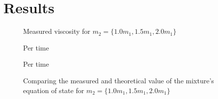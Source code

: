 \chapter{Results}

\begin{figure}[htbp]
    \begin{center}
        
        \caption{
            Measured viscosity for $m_2 = 
            \{1.0m_1, 1.5m_1, 2.0m_1\}$
        }
    \end{center}
\end{figure}

\begin{figure}[htbp]
    \begin{center}
        
        \caption{
            Per time
        }
    \end{center}
\end{figure}

\begin{figure}[htbp]
    \begin{center}
        
        \caption{
            Per time
        }
    \end{center}
\end{figure}

\begin{figure}[htbp]
    \begin{center}
        
    \end{center}
        \caption{
            Comparing the measured and theoretical value of the mixture's
            equation of state for $m_2 = \{1.0m_1, 1.5m_1, 2.0m_1\}$
        }
\end{figure}
